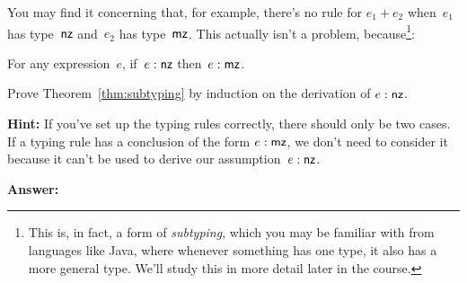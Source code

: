 \documentclass{article}
\begin{document}
{
  \centering
  \def \MathparLineskip {\lineskip=0.43cm}
}

You may find it concerning that, for example, there's no rule for
$e_1 + e_2$ when~$e_1$ has type~$\mathsf{nz}$ and~$e_2$ has type~$\mathsf{mz}$.
%
This actually isn't a problem, because\footnote{This is, in fact, a form
  of {\em subtyping}, which you may be familiar with from languages like Java,
  where whenever something has one type, it also has a more general type.
  We'll study this in more detail later in the course.}:

\begin{thm}\label{thm:subtyping}
  For any expression~$e$, if~$e : \mathsf{nz}$ then~$e : \mathsf{mz}$.
\end{thm}


\begin{task}
  Prove Theorem~\ref{thm:subtyping} by induction on the derivation of
  $e : \mathsf{nz}$.

  \textbf{Hint:} If you've set up the typing rules correctly, there should
  only be two cases. If a typing rule has a conclusion of the form
  $e : \mathsf{mz}$, we don't need to consider it because it can't be used
  to derive our assumption~$e : \mathsf{nz}$.
\end{task}

\textbf{Answer:}
\end{document}
